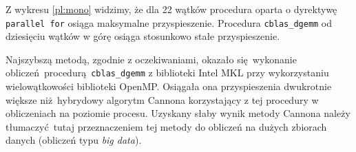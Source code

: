 Z wykresu \ref{pl:mono} widzimy, że dla 22 wątków procedura oparta o dyrektywę \texttt{parallel for} osiąga maksymalne przyspieszenie. Procedura \texttt{cblas\_dgemm} od dziesięciu wątków w górę osiąga stosunkowo stałe przyspieszenie.


Najszybszą metodą, zgodnie z oczekiwaniami, okazało się wykonanie obliczeń procedurą \texttt{cblas\_dgemm} z biblioteki Intel MKL przy wykorzystaniu wielowątkowości biblioteki OpenMP. Osiągała ona przyspieszenia dwukrotnie większe niż hybrydowy algorytm Cannona korzystający z tej procedury w obliczeniach na poziomie procesu. Uzyskany słaby wynik metody Cannona należy tłumaczyć tutaj przeznaczeniem tej metody do obliczeń na dużych zbiorach danych (obliczeń typu \emph{big data}).